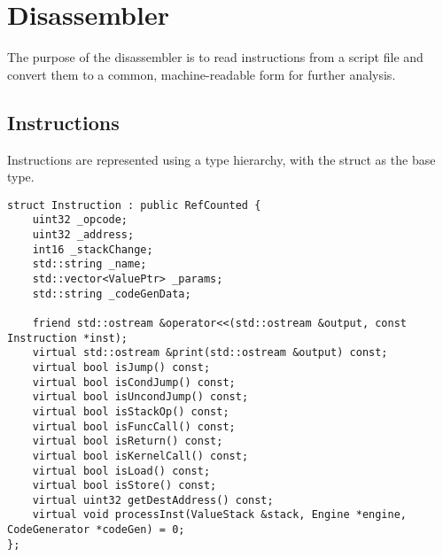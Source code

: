 \section{Disassembler}
\label{sec:disassembler}
The purpose of the disassembler is to read instructions from a script file and convert them to a common, machine-readable form for further analysis.

\subsection{Instructions}
\label{sec:instructions}
Instructions are represented using a type hierarchy, with the  struct as the base type.

\begin{C++}
\begin{lstlisting}
struct Instruction : public RefCounted {
	uint32 _opcode;
	uint32 _address;
	int16 _stackChange;
	std::string _name;
	std::vector<ValuePtr> _params;
	std::string _codeGenData;

	friend std::ostream &operator<<(std::ostream &output, const Instruction *inst);
	virtual std::ostream &print(std::ostream &output) const;
	virtual bool isJump() const;
	virtual bool isCondJump() const;
	virtual bool isUncondJump() const;
	virtual bool isStackOp() const;
	virtual bool isFuncCall() const;
	virtual bool isReturn() const;
	virtual bool isKernelCall() const;
	virtual bool isLoad() const;
	virtual bool isStore() const;
	virtual uint32 getDestAddress() const;
	virtual void processInst(ValueStack &stack, Engine *engine, CodeGenerator *codeGen) = 0;
};
\end{lstlisting}
\end{C++}

